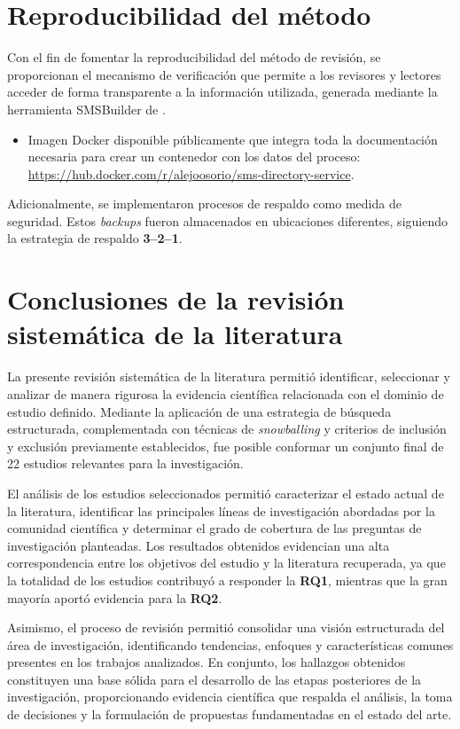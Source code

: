 \section{Reproducibilidad del método}

Con el fin de fomentar la reproducibilidad del método de revisión, se proporcionan el mecanismo de verificación que permite a los revisores y lectores acceder de forma transparente a la información utilizada, generada mediante la herramienta \ac{SMS}\-Builder de \citet{SMSBuilder2020}.

\begin{itemize}
	\item Imagen Docker disponible públicamente que integra toda la documentación necesaria para crear un contenedor con los datos del proceso:
	      \url{https://hub.docker.com/r/alejoosorio/sms-directory-service}.
\end{itemize}

\noindent
Adicionalmente, se implementaron procesos de respaldo como medida de seguridad. Estos \textit{backups} fueron almacenados en ubicaciones diferentes, siguiendo la estrategia de respaldo \textbf{3--2--1}.

\section{Conclusiones de la revisión sistemática de la literatura}

La presente revisión sistemática de la literatura permitió identificar, seleccionar y analizar de manera rigurosa la evidencia científica relacionada con el dominio de estudio definido. Mediante la aplicación de una estrategia de búsqueda estructurada, complementada con técnicas de \textit{snowballing} y criterios de inclusión y exclusión previamente establecidos, fue posible conformar un conjunto final de 22 estudios relevantes para la investigación.

El análisis de los estudios seleccionados permitió caracterizar el estado actual de la literatura, identificar las principales líneas de investigación abordadas por la comunidad científica y determinar el grado de cobertura de las preguntas de investigación planteadas. Los resultados obtenidos evidencian una alta correspondencia entre los objetivos del estudio y la literatura recuperada, ya que la totalidad de los estudios contribuyó a responder la \textbf{RQ1}, mientras que la gran mayoría aportó evidencia para la \textbf{RQ2}.

Asimismo, el proceso de revisión permitió consolidar una visión estructurada del área de investigación, identificando tendencias, enfoques y características comunes presentes en los trabajos analizados. En conjunto, los hallazgos obtenidos constituyen una base sólida para el desarrollo de las etapas posteriores de la investigación, proporcionando evidencia científica que respalda el análisis, la toma de decisiones y la formulación de propuestas fundamentadas en el estado del arte.
